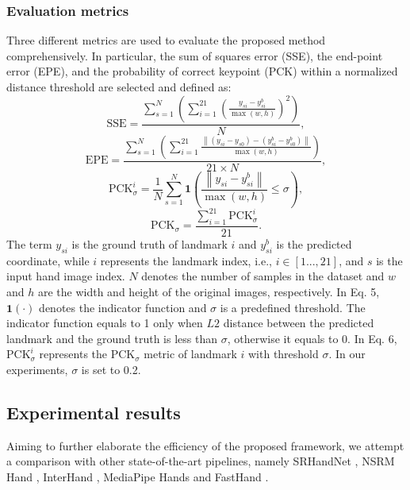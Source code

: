 \documentclass[11pt]{article}
\begin{document}
\subsubsection{Evaluation metrics}
Three different metrics are used to evaluate the proposed method comprehensively. In particular, the sum of squares error (SSE), the end-point error (EPE), and the probability of correct keypoint (PCK) within a normalized distance threshold are selected and defined as:
\begin{equation}
\mathrm{SSE} =
\frac{\sum_{s=1}^{N}\left(\sum_{i=1}^{21}\left(\frac{y_{si}-y^{b}_{si}}{\max(w,h)}\right)^{2}\right)}{N},
\tag{3}
\end{equation}
\begin{equation}
\mathrm{EPE} =
\frac{\sum_{s=1}^{N}\left(\sum_{i=1}^{21}
\frac{\left\|(y_{si}-y_{s0})-(y^{b}_{si}-y^{b}_{s0})\right\|}{\max(w,h)}\right)}{21 \times N},
\tag{4}
\end{equation}
\begin{equation}
\mathrm{PCK}^{i}_{\sigma} =
\frac{1}{N}\sum_{s=1}^{N}\mathbf{1}\!\left(\frac{\left\|y_{si}-y^{b}_{si}\right\|}{\max(w,h)} \le \sigma\right),
\tag{5}
\end{equation}
\begin{equation}
\mathrm{PCK}_{\sigma} =
\frac{\sum_{i=1}^{21}\mathrm{PCK}^{i}_{\sigma}}{21}.
\tag{6}
\end{equation}
The term $y_{si}$ is the ground truth of landmark $i$ and $y^{b}_{si}$ is the predicted coordinate, while $i$ represents the landmark index, i.e., $i \in [1..., 21]$, and $s$ is the input hand image index. $N$ denotes the number of samples in the dataset and $w$ and $h$ are the width and height of the original images, respectively. In Eq. 5, $\mathbf{1}(\cdot)$ denotes the indicator function and $\sigma$ is a predefined threshold. The indicator function equals to 1 only when $L2$ distance between the predicted landmark and the ground truth is less than $\sigma$, otherwise it equals to 0. In Eq. 6, $\mathrm{PCK}^{i}_{\sigma}$ represents the $\mathrm{PCK}_{\sigma}$ metric of landmark $i$ with threshold $\sigma$. In our experiments, $\sigma$ is set to 0.2.

\subsection{Experimental results}
Aiming to further elaborate the efficiency of the proposed framework, we attempt a comparison with other state-of-the-art pipelines, namely SRHandNet \cite{ref1}, NSRM Hand \cite{ref2}, InterHand \cite{ref3}, MediaPipe Hands \cite{ref27} and FastHand \cite{ref4}.
\end{document}
